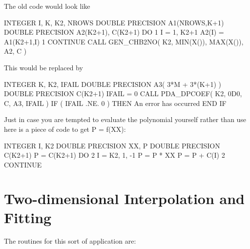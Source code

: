 \documentclass[11pt,twoside,nolof]{starlink}
\begin{document}
   The old code would look like

\begin{terminalv}
      INTEGER I, K, K2, NROWS
      DOUBLE PRECISION A1(NROWS,K+1)
      DOUBLE PRECISION A2(K2+1), C(K2+1)
      DO 1 I = 1, K2+1
         A2(I) = A1(K2+1,I)
    1 CONTINUE
      CALL GEN_CHB2NO( K2, MIN(X()), MAX(X()), A2, C )
\end{terminalv}

   This would be replaced by

\begin{terminalv}
      INTEGER K, K2, IFAIL
      DOUBLE PRECISION A3( 3*M + 3*(K+1) )
      DOUBLE PRECISION C(K2+1)
      IFAIL = 0
      CALL PDA_DPCOEF( K2, 0D0, C, A3, IFAIL )
      IF ( IFAIL .NE. 0 ) THEN
         An error has occurred
      END IF
\end{terminalv}

   Just in case you are tempted to evaluate the polynomial yourself
   rather than use
   here is a piece of code to get P = f(XX):

\begin{terminalv}
      INTEGER I, K2
      DOUBLE PRECISION XX, P
      DOUBLE PRECISION C(K2+1)
      P = C(K2+1)
      DO 2 I = K2, 1, -1
         P = P * XX
         P = P + C(I)
    2 CONTINUE
\end{terminalv}

\section{Two-dimensional
Interpolation and Fitting}

The routines for this sort of application are:
\end{document}
